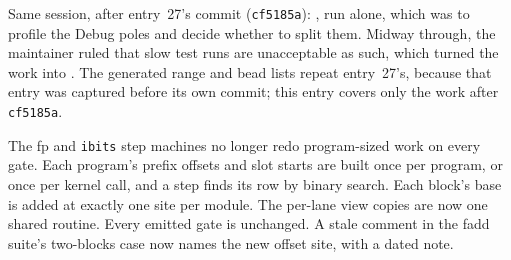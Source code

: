 \begin{generated}
\end{generated}


Same session, after entry~27's commit (\texttt{cf5185a}): , run
alone, which was to profile the Debug poles and decide whether to split
them. Midway through, the maintainer ruled that slow test runs are
unacceptable as such, which turned the work into . The generated
range and bead lists repeat entry~27's, because that entry was captured
before its own commit; this entry covers only the work after
\texttt{cf5185a}.

The fp and \texttt{ibits} step machines no longer redo program-sized work on
every gate. Each program's prefix offsets and slot starts are built once per
program, or once per kernel call, and a step finds its row by binary search.
Each block's base is added at exactly one site per module. The per-lane view
copies are now one shared routine. Every emitted gate is unchanged. A stale
comment in the fadd suite's two-blocks case now names the new
offset site, with a dated note.

